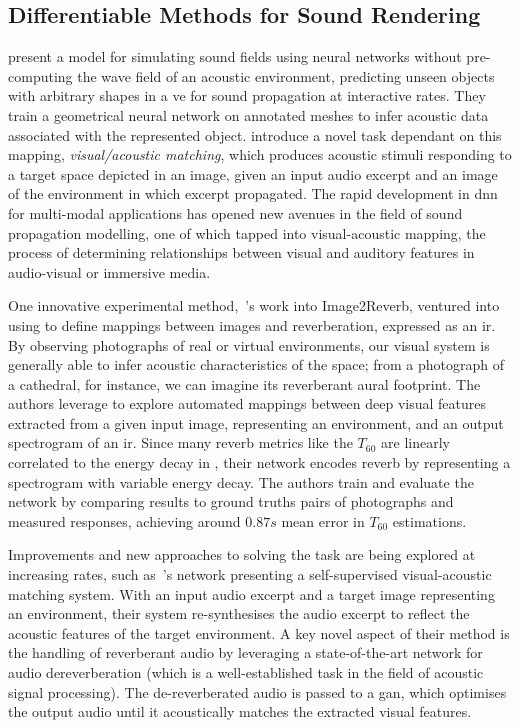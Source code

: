 \subsection{Differentiable Methods for Sound Rendering}
\cite{manocha2020differentiable} present a model for simulating sound fields using neural networks without pre-computing the wave field of an acoustic environment, predicting unseen objects with arbitrary shapes in a \acrshort{ve} for sound propagation at interactive rates. They train a geometrical neural network on annotated meshes to infer acoustic data associated with the represented object.
\cite{chen2022visual} introduce a novel task dependant on this mapping, \textit{visual/acoustic matching}, which produces acoustic stimuli responding to a target space depicted in an image, given an input audio excerpt and an image of the environment in which excerpt propagated. The rapid development in \acrshort{dnn} for multi-modal applications has opened new avenues in the field of sound propagation modelling, one of which tapped into visual-acoustic mapping, the process of determining relationships between visual and auditory features in audio-visual or immersive media.\par
One innovative experimental method,~\cite{Singh_2021_ICCV}'s work into Image2Reverb, ventured into using  to define mappings between images and reverberation, expressed as an \acrshort{ir}. By observing photographs of real or virtual environments, our visual system is generally able to infer acoustic characteristics of the space; from a photograph of a cathedral, for instance, we can imagine its reverberant aural footprint. The authors leverage  to explore automated mappings between deep visual features extracted from a given input image, representing an environment, and an output spectrogram of an \acrshort{ir}. Since many reverb metrics like the $T_{60}$ are linearly correlated to the energy decay in , their network encodes reverb by representing a spectrogram with variable energy decay. The authors train and evaluate the network by comparing results to ground truths pairs of photographs and measured responses, achieving around $0.87s$ mean error in $T_{60}$ estimations.\par
Improvements and new approaches to solving the task are being explored at increasing rates, such as~\cite{somayazulu2023self}'s network presenting a self-supervised visual-acoustic matching system. With an input audio excerpt and a target image representing an environment, their system re-synthesises the audio excerpt to reflect the acoustic features of the target environment. A key novel aspect of their method is the handling of reverberant audio by leveraging a state-of-the-art network for audio dereverberation (which is a well-established task in the field of acoustic signal processing). The de-reverberated audio is passed to a \acrshort{gan}, which optimises the output audio until it acoustically matches the extracted visual features.\par


